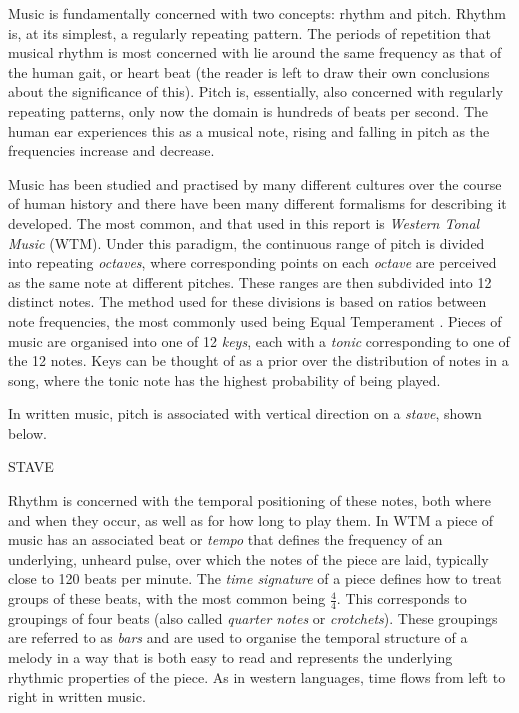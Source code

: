 \documentclass[bsc,singlespacing,logo, parskip, deptreport]{infthesis}
\begin{document}
Music is fundamentally concerned with two concepts: rhythm and pitch. Rhythm is, at its simplest, a regularly repeating pattern. The periods of repetition that musical rhythm is most concerned with lie around the same frequency as that of the human gait, or heart beat (the reader is left to draw their own conclusions about the significance of this). Pitch is, essentially, also concerned with regularly repeating patterns, only now the domain is hundreds of beats per second. The human ear experiences this as a musical note, rising and falling in pitch as the frequencies increase and decrease.

Music has been studied and practised by many different cultures over the course of human history and there have been many different formalisms for describing it developed. The most common, and that used in this report is {\em Western Tonal Music} (WTM). Under this paradigm, the continuous range of pitch is divided into repeating {\em octaves}, where corresponding points on each {\em octave} are perceived as the same note at different pitches. These ranges are then subdivided into 12 distinct notes. The method used for these divisions is based on ratios between note frequencies, the most commonly used being Equal Temperament \cite{regener1973pitch}. Pieces of music are organised into one of 12 {\em keys}, each with a {\em tonic} corresponding to one of the 12 notes. Keys can be thought of as a prior over the distribution of notes in a song, where the tonic note has the highest probability of being played.

In written music, pitch is associated with vertical direction on a {\em stave}, shown below.
{%
\parindent 0pt
\noindent
\ifx\preLilyPondExample \undefined
\else
  \expandafter\preLilyPondExample
\fi
\def\lilypondbook{}%

\ifx\postLilyPondExample \undefined
\else
  \expandafter\postLilyPondExample
\fi
} 
STAVE

Rhythm is concerned with the temporal positioning of these notes, both where and when they occur, as well as for how long to play them. In WTM a piece of music has an associated beat or {\em tempo} that defines the frequency of an underlying, unheard pulse, over which the notes of the piece are laid, typically close to 120 beats per minute. The {\em time signature} of a piece defines how to treat groups of these beats, with the most common being $\frac{4}{4}$. This corresponds to groupings of four beats (also called {\em quarter notes} or {\em crotchets}). These groupings are referred to as {\em bars} and are used to organise the temporal structure of a melody in a way that is both easy to read and represents the underlying rhythmic properties of the piece. As in western languages, time flows from left to right in written music.
\end{document}

